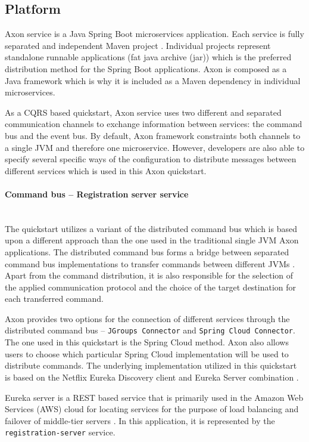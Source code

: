 \documentclass[oneside,
  digital, %
  table,   %
  lof,     %
  lot,     %
]{fithesis3}
\newcommand{\newlinepar}[1]{\paragraph{#1}\needspace{3\baselineskip}\mbox{}\\}
\begin{document}
\subsection{Platform}

Axon service is a Java Spring Boot \cite{spring_boot} microservices application. Each service is fully separated and independent Maven project \cite{maven}. Individual projects represent standalone runnable applications (fat java archive (jar)) which is the preferred distribution method for the Spring Boot applications. Axon is composed as a Java framework which is why it is included as a Maven dependency in individual microservices.

As a CQRS based quickstart, Axon service uses two different and separated communication channels to exchange information between services: the command bus and the event bus. By default, Axon framework constraints both channels to a single JVM and therefore one microservice. However, developers are also able to specify several specific ways of the configuration to distribute messages between different services which is used in this Axon quickstart.

\newlinepar{Command bus -- Registration server service}

The quickstart utilizes a variant of the distributed command bus which is based upon a different approach than the one used in the traditional single JVM Axon applications. The distributed command bus forms a bridge between separated command bus implementations to transfer commands between different JVMs \cite{axon_framework_reference_guide}. Apart from the command distribution, it is also responsible for the selection of the applied communication protocol and the choice of the target destination for each transferred command. 

Axon provides two options for the connection of different services through the distributed command bus -- \texttt{JGroups Connector} and \texttt{Spring Cloud Connector}. The one used in this quickstart is the Spring Cloud \cite{spring_cloud} method. Axon also allows users to choose which particular Spring Cloud implementation will be used to distribute commands. The underlying implementation utilized in this quickstart is based on the Netflix Eureka Discovery client and Eureka Server combination \cite{service_registration}. 

Eureka server is a REST based service that is primarily used in the Amazon Web Services (AWS) cloud for locating services for the purpose of load balancing and failover of middle-tier servers \cite{eureka}. In this application, it is represented by the \texttt{registration-server} service. 
\end{document}
